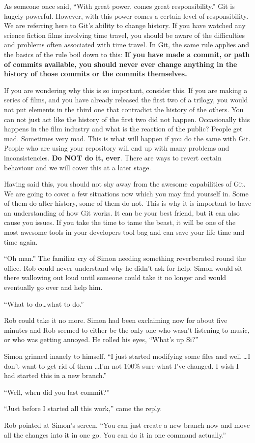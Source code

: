 As someone once said, ``With great power, comes great responsibility.''  Git is hugely powerful.  However, with this power comes a certain level of responsibility.  We are referring here to Git's ability to change history.  If you have watched any science fiction films involving time travel, you should be aware of the difficulties and problems often associated with time travel.  In Git, the same rule applies and the basics of the rule boil down to this: \textbf{If you have made a commit, or path of commits available, you should never ever change anything in the history of those commits or the commits themselves.}  

If you are wondering why this is so important, consider this.  If you are making a series of films, and you have already released the first two of a trilogy, you would not put elements in the third one that contradict the history of the others.  You can not just act like the history of the first two did not happen.  Occasionally this happens in the film industry and what is the reaction of the public?  People get mad.  Sometimes very mad.  This is what will happen if you do the same with Git.  People who are using your repository will end up with many problems and inconsistencies.  \textbf{Do NOT do it, ever}.  There are ways to revert certain behaviour and we will cover this at a later stage.

Having said this, you should not shy away from the awesome capabilities of Git.  We are going to cover a few situations now which you may find yourself in.  Some of them do alter history, some of them do not.  This is why it is important to have an understanding of how Git works.  It can be your best friend, but it can also cause you issues.  If you take the time to tame the beast, it will be one of the most awesome tools in your developers tool bag and can save your life time and time again.  

\begin{trenches}
``Oh man.'' The familiar cry of Simon needing something reverberated round the office.  Rob could never understand why he didn't ask for help.  Simon would sit there wallowing out loud until someone could take it no longer and would eventually go over and help him.

``What to do\ldots what to do.''

Rob could take it no more.  Simon had been exclaiming now for about five minutes and Rob seemed to either be the only one who wasn't listening to music, or who was getting annoyed.  He rolled his eyes, ``What's up Si?''

Simon grinned inanely to himself.  ``I just started modifying some files and well \ldots I don't want to get rid of them \ldots I'm not 100\% sure what I've changed.  I wish I had started this in a new branch.''

``Well, when did you last commit?''

``Just before I started all this work,'' came the reply.

Rob pointed at Simon's screen.  ``You can just create a new branch now and move all the changes into it in one go.  You can do it in one command actually.''
\end{trenches}

